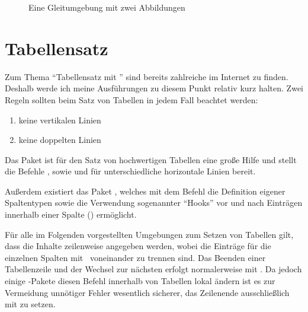\documentclass[%
  english,ngerman,%
  geometry=no,DIV=12,automark,%
]{tudscrartcl}
\begin{document}
\begin{Trunk}
\begin{figure}
%
  {\caption{Eine Gleitumgebung mit zwei Abbildungen}\label{fig:logos}}%
\end{figure}

\end{Trunk}
\InputCode



\section{Tabellensatz}
\label{sec:tables}
Zum Thema \enquote{Tabellensatz mit } sind bereits zahlreiche 
\cite{reichert2012} im Internet zu finden. Deshalb werde ich meine Ausführungen 
zu diesem Punkt relativ kurz halten. Zwei Regeln sollten beim Satz von Tabellen 
in jedem Fall beachtet werden:
%
\begin{enumerate}[itemindent=0pt,labelwidth=*,labelsep=1em,label=\Roman*.,noitemsep]
\item keine vertikalen Linien
\item keine doppelten Linien
\end{enumerate}
%
Das Paket  ist für den Satz von hochwertigen Tabellen eine 
große Hilfe und stellt die Befehle ,  sowie
 und  für unterschiedliche horizontale Linien 
bereit.
%
\begin{Preamble}
\usepackage{booktabs}
\end{Preamble}
%
Außerdem existiert das Paket , welches mit dem Befehl 
 die Definition eigener Spaltentypen sowie die Verwendung 
sogenannter \enquote{Hooks} vor und nach Einträgen innerhalb einer Spalte 
(\PValue{>\{\dots\}}\PValue{<\{\dots\}}) ermöglicht.
%
\begin{Preamble}
\usepackage{array}
\end{Preamble}
%
Für alle im Folgenden vorgestellten Umgebungen zum Setzen von Tabellen gilt, 
dass die Inhalte zeilenweise angegeben werden, wobei die Einträge für die 
einzelnen Spalten mit~\PValue{\&} voneinander zu trennen sind. Das Beenden 
einer Tabellenzeile und der Wechsel zur nächsten erfolgt normalerweise mit 
\PValue{\bsc\bsc}. Da jedoch einige -Pakete diesen Befehl 
innerhalb von Tabellen lokal ändern ist es zur Vermeidung unnötiger Fehler 
wesentlich sicherer, das Zeilenende ausschließlich mit  
zu setzen.
\end{document}
